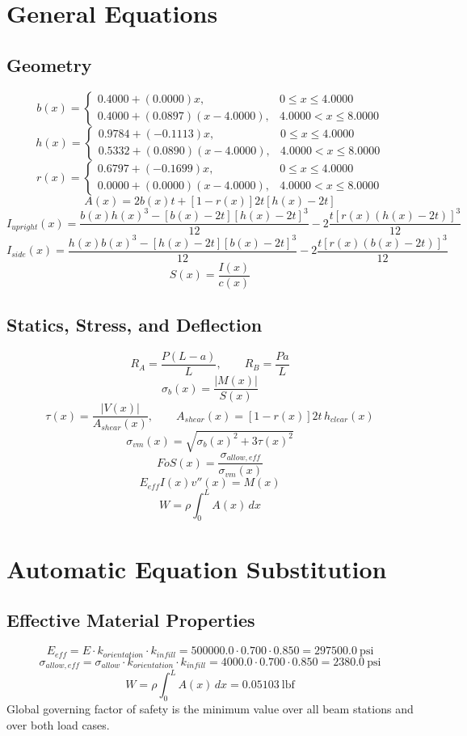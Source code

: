 \documentclass[11pt]{article}
\begin{document}
\section*{General Equations}
\subsection*{Geometry}
\[
b(x)=\begin{cases}0.4000 + (0.0000)x, & 0 \le x \le 4.0000\\0.4000 + (0.0897)(x-4.0000), & 4.0000 < x \le 8.0000\end{cases}
\]
\[
h(x)=\begin{cases}0.9784 + (-0.1113)x, & 0 \le x \le 4.0000\\0.5332 + (0.0890)(x-4.0000), & 4.0000 < x \le 8.0000\end{cases}
\]
\[
r(x)=\begin{cases}0.6797 + (-0.1699)x, & 0 \le x \le 4.0000\\0.0000 + (0.0000)(x-4.0000), & 4.0000 < x \le 8.0000\end{cases}
\]
\[
A(x)=2b(x)t+[1-r(x)]2t[h(x)-2t]
\]
\[
I_{upright}(x)=\frac{b(x)h(x)^3-[b(x)-2t][h(x)-2t]^3}{12}-2\frac{t[r(x)(h(x)-2t)]^3}{12}
\]
\[
I_{side}(x)=\frac{h(x)b(x)^3-[h(x)-2t][b(x)-2t]^3}{12}-2\frac{t[r(x)(b(x)-2t)]^3}{12}
\]
\[
S(x)=\frac{I(x)}{c(x)}
\]

\subsection*{Statics, Stress, and Deflection}
\[
R_A=\frac{P(L-a)}{L}, \qquad R_B=\frac{Pa}{L}
\]
\[
\sigma_b(x)=\frac{|M(x)|}{S(x)}
\]
\[
\tau(x)=\frac{|V(x)|}{A_{shear}(x)}, \qquad A_{shear}(x)=[1-r(x)]2t\,h_{clear}(x)
\]
\[
\sigma_{vm}(x)=\sqrt{\sigma_b(x)^2+3\tau(x)^2}
\]
\[
FoS(x)=\frac{\sigma_{allow,eff}}{\sigma_{vm}(x)}
\]
\[
E_{eff}I(x)v''(x)=M(x)
\]
\[
W=\rho\int_0^L A(x)\,dx
\]

\section*{Automatic Equation Substitution}
\subsection*{Effective Material Properties}
\[E_{eff} = E \cdot k_{orientation} \cdot k_{infill} = 500000.0 \cdot 0.700 \cdot 0.850 = 297500.0\ \mathrm{psi}\]
\[\sigma_{allow,eff} = \sigma_{allow} \cdot k_{orientation} \cdot k_{infill} = 4000.0 \cdot 0.700 \cdot 0.850 = 2380.0\ \mathrm{psi}\]
\[W = \rho \int_0^L A(x)\,dx = 0.05103\ \mathrm{lbf}\]
Global governing factor of safety is the minimum value over all beam stations and over both load cases.
\end{document}
